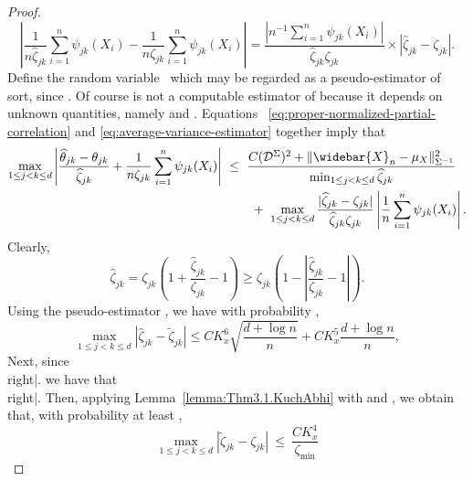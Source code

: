\documentclass{article}
\begin{document}
\begin{appendices}
\begin{proof}
\begin{equation}\label{eq:average-variance-estimator}
\left|\frac{1}{n\widehat{\zeta}_{jk}}\sum_{i=1}^n \psi_{jk}(X_i) - \frac{1}{n\zeta_{jk}}\sum_{i=1}^n \psi_{jk}(X_i)\right| = \frac{|n^{-1}\sum_{i=1}^n \psi_{jk}(X_i)|}{\widehat{\zeta}_{jk}\zeta_{jk}}\times|\widehat{\zeta}_{jk} - \zeta_{jk}|.
\end{equation}
Define the random variable
\ which may be regarded as a pseudo-estimator of sort, since  . Of course   is not a computable
estimator of   because it depends on unknown quantities, namely   and  .
Equations ~\eqref{eq:proper-normalized-partial-correlation} and \eqref{eq:average-variance-estimator} together imply that
\begin{equation}\label{eq:combination-influence-fn-exp-partial-correlation}
\begin{split}
\max_{1\le j < k\le d}\left|\frac{\widehat{\theta}_{jk} - \theta_{jk}}{\widehat{\zeta}_{jk}} + \frac{1}{n\zeta_{jk}}\sum_{i=1}^n \psi_{jk}(X_i)\right| ~&\le~ \frac{C(\mathcal{D}^{\Sigma})^2 + \|\widebar{X}_n - \mu_X\|_{\Sigma^{-1}}^2}{\min_{1\le j < k\le d}\widehat{\zeta}_{jk}}\\ ~&\qquad+~ \max_{1\le j < k\le d}\frac{|\widehat{\zeta}_{jk} - \zeta_{jk}|}{\widehat{\zeta}_{jk}\zeta_{jk}}\left|\frac{1}{n}\sum_{i=1}^n \psi_{jk}(X_i)\right|.
\end{split}
\end{equation}
Clearly,
\begin{equation}\label{eq:bound-hat.sigma-sigma}
\widehat{\zeta}_{jk} = \zeta_{jk}\left(1 + \frac{\widehat{\zeta}_{jk}}{\zeta_{jk}} - 1\right) \ge \zeta_{jk}\left(1 - \left|\frac{\widehat{\zeta}_{jk}}{\zeta_{jk}} - 1\right|\right).
\end{equation}
Using the pseudo-estimator  , we have with probability  ,
\begin{equation}\label{eq:sigma-hat-to-sigma-tilde}
\max_{1\le j < k\le d}|\widehat{\zeta}_{jk} - \widetilde{\zeta}_{jk}| \le CK_x^6\sqrt{\frac{d + \log n}{n}} + CK_x^5\frac{d + \log n}{n},
\end{equation}
Next, since
\\right|.
\]
we have that
\\right|.
\]
Then, applying
Lemma~\ref{lemma:Thm3.1.KuchAbhi} with   and  ,
we obtain that, with probability at least  ,
\begin{equation}\label{eq:sigma-tilde-to-sigma}
\max_{1\le j < k\le d}\left|\widetilde{\zeta}_{jk} - \zeta_{jk}\right| ~\le~ \frac{CK_x^4}{\zeta_{\min}}\left.
\end{equation}

\end{proof}
\end{appendices}
\end{document}
